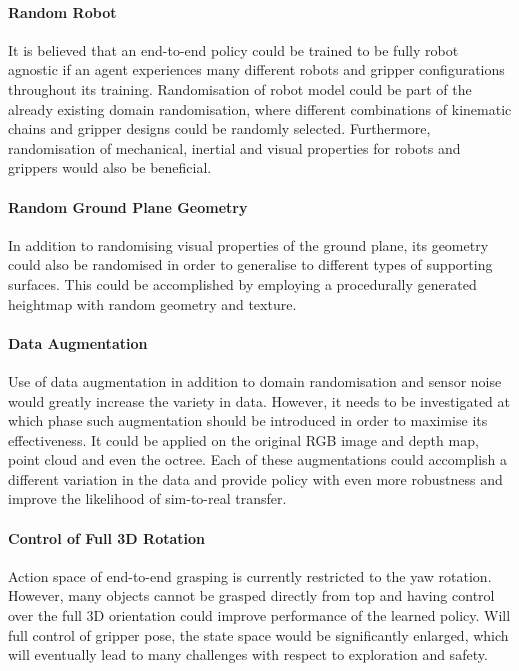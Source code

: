 \paragraph{Random Robot} It is believed that an end-to-end policy could be trained to be fully robot agnostic if an agent experiences many different robots and gripper configurations throughout its training. Randomisation of robot model could be part of the already existing domain randomisation, where different combinations of kinematic chains and gripper designs could be randomly selected. Furthermore, randomisation of mechanical, inertial and visual properties for robots and grippers would also be beneficial.

\paragraph{Random Ground Plane Geometry} In addition to randomising visual properties of the ground plane, its geometry could also be randomised in order to generalise to different types of supporting surfaces. This could be accomplished by employing a procedurally generated heightmap with random geometry and texture.

\paragraph{Data Augmentation} Use of data augmentation in addition to domain randomisation and sensor noise would greatly increase the variety in data. However, it needs to be investigated at which phase such augmentation should be introduced in order to maximise its effectiveness. It could be applied on the original RGB image and depth map, point cloud and even the octree. Each of these augmentations could accomplish a different variation in the data and provide policy with even more robustness and improve the likelihood of sim-to-real transfer.

\paragraph{Control of Full 3D Rotation} Action space of end-to-end grasping is currently restricted to the yaw rotation. However, many objects cannot be grasped directly from top and having control over the full 3D orientation could improve performance of the learned policy. Will full control of gripper pose, the state space would be significantly enlarged, which will eventually lead to many challenges with respect to exploration and safety.

